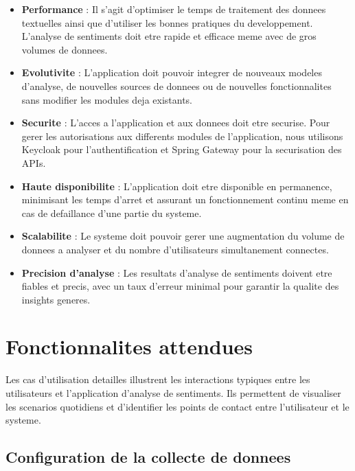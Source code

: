 \begin{itemize}
    \item \textbf{Performance} : Il s'agit d'optimiser le temps de traitement des donnees textuelles ainsi que d'utiliser les bonnes pratiques du developpement. L'analyse de sentiments doit etre rapide et efficace meme avec de gros volumes de donnees.
    
    \item \textbf{Evolutivite} : L'application doit pouvoir integrer de nouveaux modeles d'analyse, de nouvelles sources de donnees ou de nouvelles fonctionnalites sans modifier les modules deja existants.
    
    \item \textbf{Securite} : L'acces a l'application et aux donnees doit etre securise. Pour gerer les autorisations aux differents modules de l'application, nous utilisons Keycloak pour l'authentification et Spring Gateway pour la securisation des APIs.
    
    \item \textbf{Haute disponibilite} : L'application doit etre disponible en permanence, minimisant les temps d'arret et assurant un fonctionnement continu meme en cas de defaillance d'une partie du systeme.
    
    \item \textbf{Scalabilite} : Le systeme doit pouvoir gerer une augmentation du volume de donnees a analyser et du nombre d'utilisateurs simultanement connectes.
    
    \item \textbf{Precision d'analyse} : Les resultats d'analyse de sentiments doivent etre fiables et precis, avec un taux d'erreur minimal pour garantir la qualite des insights generes.
\end{itemize}

\section{Fonctionnalites attendues}

Les cas d'utilisation detailles illustrent les interactions typiques entre les utilisateurs et l'application d'analyse de sentiments. Ils permettent de visualiser les scenarios quotidiens et d'identifier les points de contact entre l'utilisateur et le systeme.

\subsection{Configuration de la collecte de donnees}

